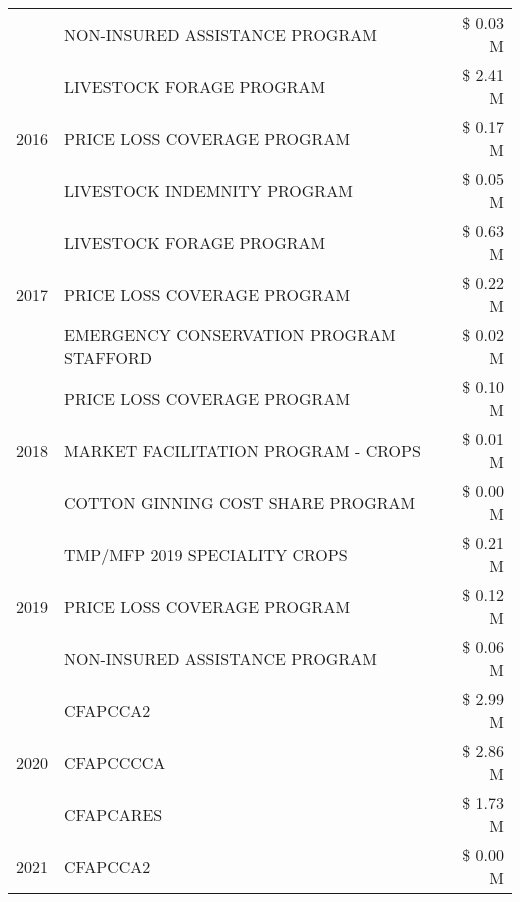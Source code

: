 \begin{tabular}{llr}
 & NON-INSURED ASSISTANCE PROGRAM & \$ 0.03 M \\
\cline{1-3}
\multirow[t]{3}{*}{2016} & LIVESTOCK FORAGE PROGRAM & \$ 2.41 M \\
 & PRICE LOSS COVERAGE PROGRAM & \$ 0.17 M \\
 & LIVESTOCK INDEMNITY PROGRAM & \$ 0.05 M \\
\cline{1-3}
\multirow[t]{3}{*}{2017} & LIVESTOCK FORAGE PROGRAM & \$ 0.63 M \\
 & PRICE LOSS COVERAGE PROGRAM & \$ 0.22 M \\
 & EMERGENCY CONSERVATION PROGRAM STAFFORD & \$ 0.02 M \\
\cline{1-3}
\multirow[t]{3}{*}{2018} & PRICE LOSS COVERAGE PROGRAM & \$ 0.10 M \\
 & MARKET FACILITATION PROGRAM - CROPS & \$ 0.01 M \\
 & COTTON GINNING COST SHARE PROGRAM & \$ 0.00 M \\
\cline{1-3}
\multirow[t]{3}{*}{2019} & TMP/MFP 2019 SPECIALITY CROPS & \$ 0.21 M \\
 & PRICE LOSS COVERAGE PROGRAM & \$ 0.12 M \\
 & NON-INSURED ASSISTANCE PROGRAM & \$ 0.06 M \\
\cline{1-3}
\multirow[t]{3}{*}{2020} & CFAPCCA2 & \$ 2.99 M \\
 & CFAPCCCCA & \$ 2.86 M \\
 & CFAPCARES & \$ 1.73 M \\
\cline{1-3}
2021 & CFAPCCA2 & \$ 0.00 M \\
\cline{1-3}
\bottomrule
\end{tabular}
